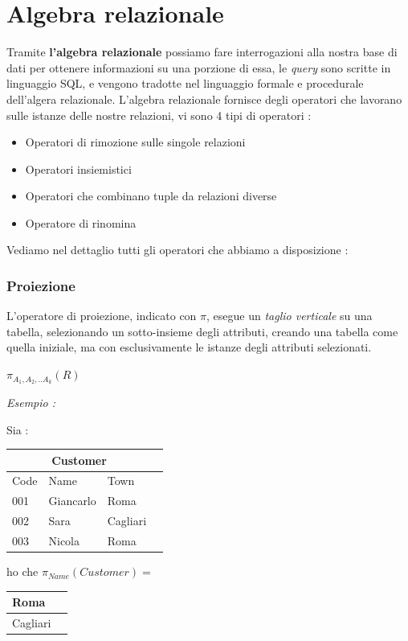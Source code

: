 \documentclass[12pt, letterpaper]{article}
\begin{document}
\newpage\section{Algebra relazionale}
Tramite \textbf{l'algebra relazionale} possiamo fare interrogazioni alla nostra base di dati per 
ottenere informazioni su una porzione di essa, le \textit{query} sono scritte in linguaggio SQL, e vengono
tradotte nel linguaggio formale e procedurale dell'algera relazionale. L'algebra relazionale fornisce 
degli operatori che lavorano sulle istanze delle nostre relazioni, vi sono 4 tipi di operatori :
\begin{itemize}
    \item Operatori di rimozione sulle singole relazioni
    \item Operatori insiemistici 
    \item Operatori che combinano tuple da relazioni diverse 
    \item Operatore di rinomina
\end{itemize}
Vediamo nel dettaglio tutti gli operatori che abbiamo a disposizione :
\subsubsection{Proiezione}
L'operatore di proiezione, indicato con \(\pi\), esegue un \textit{taglio verticale} su una 
tabella, selezionando un sotto-insieme degli attributi, creando una tabella come quella iniziale, 
ma con esclusivamente le istanze degli attributi selezionati.\begin{center}
    \( \pi_{A_1,A_2,..A_k}(R) \) 
\end{center}
\textit{Esempio :}\begin{center} Sia : 
    \begin{tabular}{|l|l|l|r|}
        \hline
    \multicolumn{3}{|c|}{\textbf{Customer}}\\
        \hline
        Code & Name & Town \\
        \hline
        001 & Giancarlo & Roma \\
        \hline
        002 & Sara & Cagliari \\
        \hline
        003 & Nicola & Roma \\
        \hline
        \end{tabular}
        ho che \(\pi_{Name}(Customer)=\)
        \begin{tabular}{ |l|r| } 
            
            \hline Roma \\ 
            \hline Cagliari  \\ 
            \hline
           \end{tabular}
\end{center}
\end{document}
